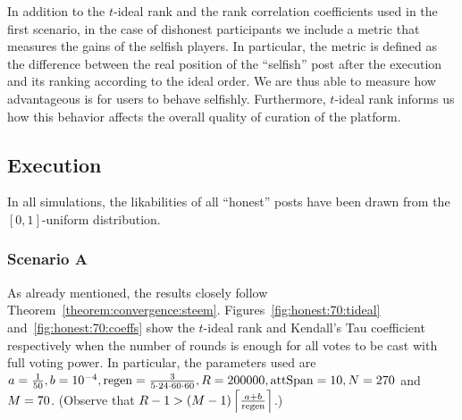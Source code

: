 %
    In addition to the $t$-ideal rank and the rank correlation coefficients used
    in the first scenario, in the case of dishonest participants we include a
    metric that measures the gains of the selfish players. In particular, the
    metric is defined as the difference between the real position of the
    ``selfish'' post after the execution and its ranking according to the ideal
    order. We are thus able to measure how advantageous is for users to behave
    selfishly. Furthermore, $t$-ideal rank informs us how this behavior affects
    the overall quality of curation of the platform.

  \subsection{Execution}
    In all simulations, the likabilities of all ``honest'' posts have been drawn
    from the $\left[0, 1\right]$-uniform distribution.

    \subsubsection*{Scenario A}
      As already mentioned, the results closely follow
      Theorem~\ref{theorem:convergence:steem}.
      Figures~\ref{fig:honest:70:tideal} and~\ref{fig:honest:70:coeffs} show the
      $t$-ideal rank and Kendall's Tau coefficient respectively when the number
      of rounds is enough for all votes to be cast with full voting power. In
      particular, the parameters used are $a = \frac{1}{50}, b = 10^{-4}, \regen
      = \frac{3}{5 \cdot 24 \cdot 60 \cdot 60}, \rounds = 200000, \attspan = 10,
      \playerlen = 270$ and $\postlen = 70$. (Observe that $\rounds - 1 >
      \left(\postlen - 1\right)\ceil*{\frac{a + b}{\regen}}$.)

